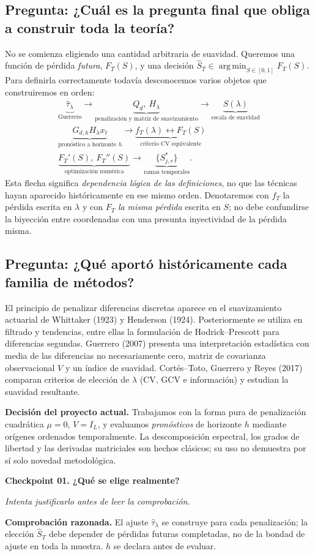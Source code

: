 \documentclass[11pt,letterpaper,parskip=half,headings=small]{scrartcl}
\theoremstyle{definition}\newtheorem{definicion}[proposicion]{Definición}
\theoremstyle{remark}\newtheorem{observacion}[proposicion]{Observación}
\newcommand{\argmin}{\operatorname*{arg\,min}}\newcommand{\diag}{\operatorname{diag}}
\newcommand{\pregunta}[1]{\subsection{Pregunta: #1}}
\newcommand{\checkpoint}[3]{%
  \par\medskip\noindent\textbf{\color{blue!45!black}Checkpoint #1. #2}\par
  \noindent\emph{Intenta justificarlo antes de leer la comprobación.}\par
  \noindent\textbf{Comprobación razonada. }#3\par\bigskip
}
\begin{document}
\pregunta{¿Cuál es la pregunta final que obliga a construir toda la teoría?}
No se comienza eligiendo una cantidad arbitraria de suavidad. Queremos una función de pérdida
\emph{futura}, $F_T(S)$, y una decisión $\widehat S_T\in\argmin_{S\in[0,1]}F_T(S)$.
Para definirla correctamente todavía desconocemos varios objetos que construiremos en orden:
\[
\begin{gathered}
\underbrace{\widehat\tau_\lambda}_{\text{Guerrero}}
\longrightarrow\underbrace{Q_d,\ H_\lambda}_{\text{penalización y matriz de suavizamiento}}
\longrightarrow\underbrace{S(\lambda)}_{\text{escala de suavidad}}\\[4pt]
\underbrace{G_{d,h}H_\lambda x_t}_{\text{pronóstico a horizonte }h}
\longrightarrow\underbrace{f_T(\lambda)\longleftrightarrow F_T(S)}_{\text{criterio CV equivalente}}\\[4pt]
\underbrace{F_T'(S),\ F_T''(S)}_{\text{optimización numérica}}
\longrightarrow\underbrace{\{S^*_{j,r}\}}_{\text{ramas temporales}}.
\end{gathered}
\]
Esta flecha significa \emph{dependencia lógica de las definiciones}, no que las técnicas hayan
aparecido históricamente en ese mismo orden. Denotaremos con $f_T$ la pérdida escrita en
$\lambda$ y con $F_T$ \emph{la misma pérdida} escrita en $S$; no debe confundirse la
biyección entre coordenadas con una presunta inyectividad de la pérdida misma.

\pregunta{¿Qué aportó históricamente cada familia de métodos?}
El principio de penalizar diferencias discretas aparece en el suavizamiento actuarial de Whittaker (1923) y Henderson (1924). Posteriormente se utiliza en filtrado y tendencias, entre ellas la formulación de Hodrick--Prescott para diferencias segundas. Guerrero (2007) presenta una interpretación estadística con media de las diferencias no necesariamente cero, matriz de covarianza observacional $V$ y un índice de suavidad. Cortés--Toto, Guerrero y Reyes (2017) comparan criterios de elección de $\lambda$ (CV, GCV e información) y estudian la suavidad resultante.

\textbf{Decisión del proyecto actual.} Trabajamos con la forma pura de penalización cuadrática $\mu=0$, $V=I_L$, y evaluamos \emph{pronósticos} de horizonte $h$ mediante orígenes ordenados temporalmente. La descomposición espectral, los grados de libertad y las derivadas matriciales son hechos clásicos; su uso no demuestra por sí solo novedad metodológica.

\checkpoint{01}{¿Qué se elige realmente?}{El ajuste $\widehat\tau_\lambda$ se construye para cada penalización; la elección $\widehat S_T$ debe depender de pérdidas futuras completadas, no de la bondad de ajuste en toda la muestra. $h$ se declara antes de evaluar.}
\end{document}
